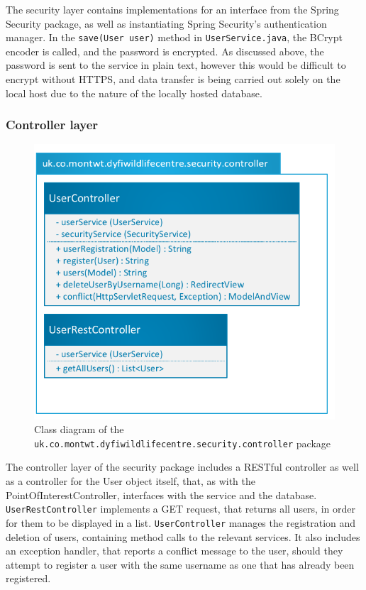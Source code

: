 The security layer contains implementations for an interface from the Spring Security package, as well as instantiating Spring Security's authentication manager. In the \texttt{save(User user)} method in \texttt{UserService.java}, the BCrypt encoder is called, and the password is encrypted. As discussed above, the password is sent to the service in plain text, however this would be difficult to encrypt without HTTPS, and data transfer is being carried out solely on the local host due to the nature of the locally hosted database.

\subsubsection{Controller layer}
\begin{figure}[H]
\includegraphics[scale=0.7]{diagrams/security/controller}
\caption{Class diagram of the \texttt{uk.co.montwt.dyfiwildlifecentre.security.controller} package}
\end{figure}

The controller layer of the security package includes a RESTful controller as well as a controller for the User object itself, that, as with the PointOfInterestController, interfaces with the service and the database. \texttt{UserRestController} implements a GET request, that returns all users, in order for them to be displayed in a list. \texttt{UserController} manages the registration and deletion of users, containing method calls to the relevant services. It also includes an exception handler, that reports a conflict message to the user, should they attempt to register a user with the same username as one that has already been registered.


